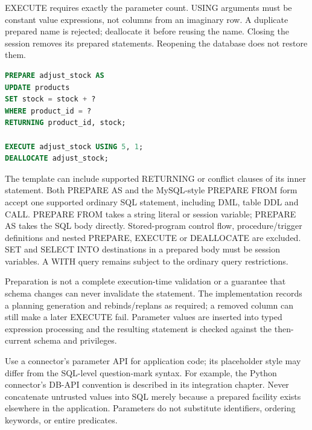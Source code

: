 EXECUTE requires exactly the parameter count. USING arguments must be constant value expressions, not columns from an imaginary row. A duplicate prepared name is rejected; deallocate it before reusing the name. Closing the session removes its prepared statements. Reopening the database does not restore them.

\begin{lstlisting}[language=SQL]
PREPARE adjust_stock AS
UPDATE products
SET stock = stock + ?
WHERE product_id = ?
RETURNING product_id, stock;

EXECUTE adjust_stock USING 5, 1;
DEALLOCATE adjust_stock;
\end{lstlisting}

The template can include supported RETURNING or conflict clauses of its inner statement. Both PREPARE AS and the MySQL-style PREPARE FROM form accept one supported ordinary SQL statement, including DML, table DDL and CALL. PREPARE FROM takes a string literal or session variable; PREPARE AS takes the SQL body directly. Stored-program control flow, procedure/trigger definitions and nested PREPARE, EXECUTE or DEALLOCATE are excluded. SET and SELECT INTO destinations in a prepared body must be session variables. A WITH query remains subject to the ordinary query restrictions.

Preparation is not a complete execution-time validation or a guarantee that schema changes can never invalidate the statement. The implementation records a planning generation and rebinds/replans as required; a removed column can still make a later EXECUTE fail. Parameter values are inserted into typed expression processing and the resulting statement is checked against the then-current schema and privileges.

Use a connector's parameter API for application code; its placeholder style may differ from the SQL-level question-mark syntax. For example, the Python connector's DB-API convention is described in its integration chapter. Never concatenate untrusted values into SQL merely because a prepared facility exists elsewhere in the application. Parameters do not substitute identifiers, ordering keywords, or entire predicates.



